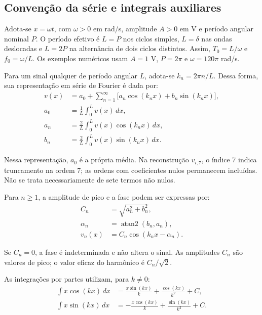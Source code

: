 \subsection{Convenção da série e integrais auxiliares}
Adota-se $x=\omega t$, com $\omega>0$ em rad/s, amplitude $A>0$
em V e período angular nominal $P$. O período efetivo é $L=P$
nos ciclos simples, $L=\delta$ nas ondas deslocadas e $L=2P$ na
alternância de dois ciclos distintos. Assim, $T_0=L/\omega$ e
$f_0=\omega/L$. Os exemplos numéricos usam $A=1$ V, $P=2\pi$
e $\omega=120\pi$ rad/s.

Para um sinal qualquer de período angular $L$, adota-se $k_n=2\pi n/L$. Dessa forma, sua representação em série de Fourier é dada por:
\begin{equation}
    \begin{aligned}
        v(x)&=a_0+\sum_{n=1}^{\infty}\bigl[
            a_n\cos(k_nx)+b_n\sin(k_nx)\bigr], \\
        a_0&=\frac{1}{L}\int_0^L v(x)\,dx, \\
        a_n&=\frac{2}{L}\int_0^L v(x)\cos(k_nx)\,dx, \\
        b_n&=\frac{2}{L}\int_0^L v(x)\sin(k_nx)\,dx.
    \end{aligned}
    \label{eq:convencao_fourier}
\end{equation}

Nessa representação, $a_0$ é a própria média.
Na reconstrução $v_{i,7}$, o índice 7 indica truncamento na ordem 7;
as ordens com coeficientes nulos permanecem incluídas. Não se trata
necessariamente de sete termos não nulos.

Para $n\geq1$, a amplitude de pico e a fase podem ser expressas por:
\begin{equation}
    \begin{aligned}
        C_n&=\sqrt{a_n^2+b_n^2}, \\
        \alpha_n&=\operatorname{atan2}(b_n,a_n), \\
        v_n(x)&=C_n\cos(k_nx-\alpha_n).
    \end{aligned}
\end{equation}

Se $C_n=0$, a fase é indeterminada e não altera o sinal. As amplitudes
$C_n$ são valores de pico; o valor eficaz do harmônico é $C_n/\sqrt{2}$.

As integrações por partes utilizam, para $k\neq0$:
\begin{equation}
    \begin{aligned}
        \int x\cos(kx)\,dx
            &=\frac{x\sin(kx)}{k}+\frac{\cos(kx)}{k^2}+C, \\
        \int x\sin(kx)\,dx
            &=-\frac{x\cos(kx)}{k}+\frac{\sin(kx)}{k^2}+C.
    \end{aligned}
\end{equation}

